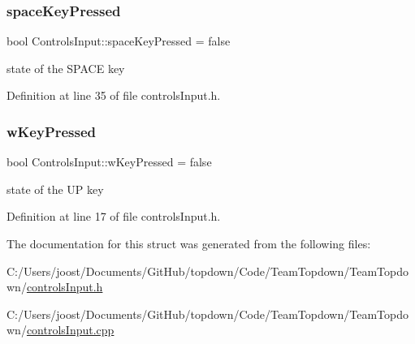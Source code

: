 \subsubsection{\texorpdfstring{space\+Key\+Pressed}{spaceKeyPressed}}
{\footnotesize\ttfamily bool Controls\+Input\+::space\+Key\+Pressed = false}

state of the S\+P\+A\+CE key 

Definition at line 35 of file controls\+Input.\+h.

\mbox{\label{struct_controls_input_adaef41f564822ecd14cc59ac5549f517}} 
\subsubsection{\texorpdfstring{w\+Key\+Pressed}{wKeyPressed}}
{\footnotesize\ttfamily bool Controls\+Input\+::w\+Key\+Pressed = false}

state of the UP key 

Definition at line 17 of file controls\+Input.\+h.



The documentation for this struct was generated from the following files\+:\begin{DoxyCompactItemize}
\item 
C\+:/\+Users/joost/\+Documents/\+Git\+Hub/topdown/\+Code/\+Team\+Topdown/\+Team\+Topdown/\hyperlink{controls_input_8h}{controls\+Input.\+h}\item 
C\+:/\+Users/joost/\+Documents/\+Git\+Hub/topdown/\+Code/\+Team\+Topdown/\+Team\+Topdown/\hyperlink{controls_input_8cpp}{controls\+Input.\+cpp}\end{DoxyCompactItemize}
